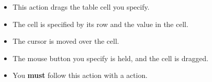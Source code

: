 
\begin{itemize}
\item This action drags the table cell you specify.
\item The cell is specified by its row and the value in the cell. 
\item The cursor is moved over the cell.
\item The mouse button you specify is held, and the cell is dragged. 
\item You \textbf{must} follow this action with a  action.
\end{itemize}


